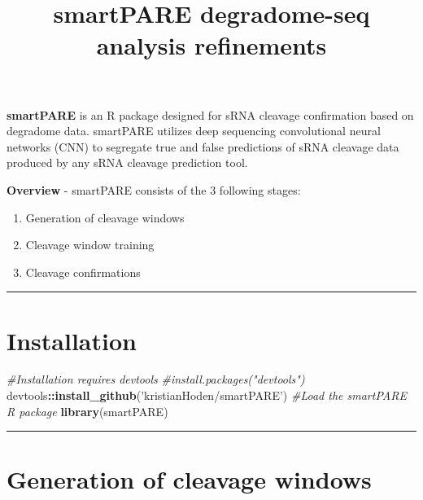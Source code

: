 \documentclass[
]{article}
\title{smartPARE degradome-seq analysis refinements}
\author{}
\date{\vspace{-2.5em}}
\newenvironment{Shaded}{\begin{snugshade}}{\end{snugshade}}
\newcommand{\CommentTok}[1]{\textcolor[rgb]{0.56,0.35,0.01}{\textit{#1}}}
\newcommand{\KeywordTok}[1]{\textcolor[rgb]{0.13,0.29,0.53}{\textbf{#1}}}
\newcommand{\NormalTok}[1]{#1}
\newcommand{\OperatorTok}[1]{\textcolor[rgb]{0.81,0.36,0.00}{\textbf{#1}}}
\newcommand{\StringTok}[1]{\textcolor[rgb]{0.31,0.60,0.02}{#1}}
\providecommand{\tightlist}{%
  \setlength{\itemsep}{0pt}\setlength{\parskip}{0pt}}
\begin{document}
\maketitle

\textbf{smartPARE} is an R package designed for sRNA cleavage
confirmation based on degradome data. smartPARE utilizes deep sequencing
convolutional neural networks (CNN) to segregate true and false
predictions of sRNA cleavage data produced by any sRNA cleavage
prediction tool.

\textbf{Overview} - smartPARE consists of the 3 following stages:

\begin{enumerate}
\def\labelenumi{\arabic{enumi}.}
\tightlist
\item
  Generation of cleavage windows
\item
  Cleavage window training
\item
  Cleavage confirmations
\end{enumerate}

\begin{center}\rule{0.5\linewidth}{0.5pt}\end{center}

\hypertarget{installation}{%
\section{Installation}\label{installation}}

\begin{Shaded}
\begin{Highlighting}[]
\CommentTok{#Installation requires devtools}
\CommentTok{#install.packages("devtools")}
\NormalTok{devtools}\OperatorTok{::}\KeywordTok{install_github}\NormalTok{(}\StringTok{'kristianHoden/smartPARE'}\NormalTok{)}
\CommentTok{#Load the smartPARE R package}
\KeywordTok{library}\NormalTok{(smartPARE)}
\end{Highlighting}
\end{Shaded}

\begin{center}\rule{0.5\linewidth}{0.5pt}\end{center}

\hypertarget{generation-of-cleavage-windows}{%
\section{Generation of cleavage
windows}\label{generation-of-cleavage-windows}}
\end{document}
